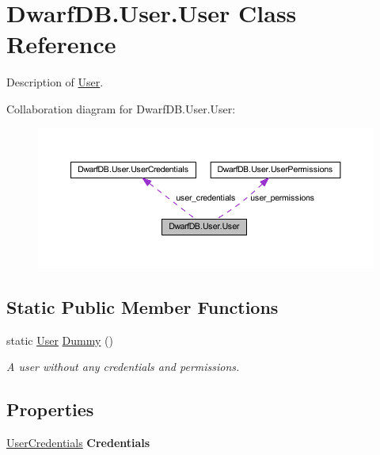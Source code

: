 \hypertarget{class_dwarf_d_b_1_1_user_1_1_user}{
\section{DwarfDB.User.User Class Reference}
\label{class_dwarf_d_b_1_1_user_1_1_user}
}


Description of \hyperlink{class_dwarf_d_b_1_1_user_1_1_user}{User}.  




Collaboration diagram for DwarfDB.User.User:\nopagebreak
\begin{figure}[H]
\begin{center}
\leavevmode
\includegraphics[width=400pt]{class_dwarf_d_b_1_1_user_1_1_user__coll__graph}
\end{center}
\end{figure}
\subsection*{Static Public Member Functions}
\begin{DoxyCompactItemize}
\item 
static \hyperlink{class_dwarf_d_b_1_1_user_1_1_user}{User} \hyperlink{class_dwarf_d_b_1_1_user_1_1_user_acea2310c87e9c0606c9ee370e5946ea9}{Dummy} ()
\begin{DoxyCompactList}\small\item\em A user without any credentials and permissions. \item\end{DoxyCompactList}\end{DoxyCompactItemize}
\subsection*{Properties}
\begin{DoxyCompactItemize}
\item 
\hypertarget{class_dwarf_d_b_1_1_user_1_1_user_ab59cfb6b9b4044adc4f20bb342bd0eef}{
\hyperlink{class_dwarf_d_b_1_1_user_1_1_user_credentials}{UserCredentials} {\bfseries Credentials}}
\label{class_dwarf_d_b_1_1_user_1_1_user_ab59cfb6b9b4044adc4f20bb342bd0eef}

\end{DoxyCompactItemize}


